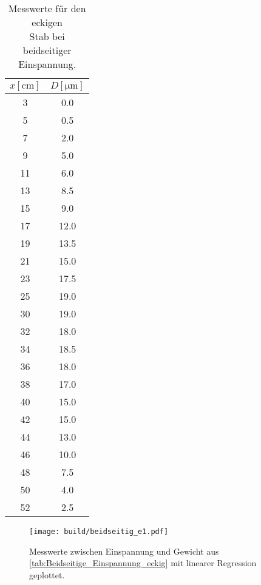 \begin{table}
\begin{minipage}{0.48\linewidth}
        \centering
        \caption{Messwerte für den eckigen \\Stab bei beidseitiger Einspannung.}
        \label{tab:Beidseitige_Einspannung_eckig}
        \begin{tabular}[h!]{|c|c|}
            \toprule
            {$x\left[\unit{\centi\meter}\right]$} & {$D\left[\unit{\micro\meter}\right]$}\\
            \midrule
            3& 0.0\\
            5& 0.5\\
            7& 2.0\\
            9& 5.0\\
            11& 6.0\\
            13& 8.5\\
            15& 9.0\\
            17& 12.0\\
            19& 13.5\\
            21& 15.0\\
            23& 17.5\\
            25& 19.0\\
            \hline
            30& 19.0\\
            32& 18.0\\
            34& 18.5\\
            36& 18.0\\
            38& 17.0\\
            40& 15.0\\
            42& 15.0\\
            44& 13.0\\
            46& 10.0\\
            48& 7.5\\
            50& 4.0\\
            52& 2.5\\
            \bottomrule
        \end{tabular}
    \end{minipage}
\end{table}
\newpage
\begin{figure}%
    \centering
    \texttt{[image: build/beidseitig\_e1.pdf]}
    \caption{Messwerte zwischen Einspannung und Gewicht aus \autoref{tab:Beidseitige_Einspannung_eckig} mit linearer Regression geplottet.}
    \label{fig:eckig_beidseitig1}
\end{figure}
